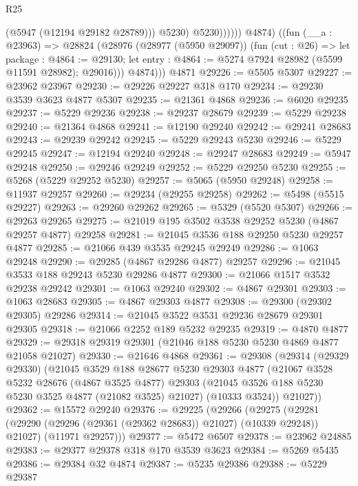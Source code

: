 \begin{lexlean}{R25}
\begin{coremodule}
                        (@5947 (@12194 @29182 @28789)))
                      @5230)
                    @5230))))))
          @4874)
        ((fun (__a : @23963) =>
        @28824
          (@28976
            (@28977 (@5950 @29097))
            (fun (cut : @26) =>
            let package : @4864 := @29130;
            let entry : @4864 := @5274 @7924 @28982 (@5599 @11591 @28982); @29016)))
          @4874)))
    @4871
@29226 := @5505 @5307
@29227 := @23962 @23967
@29230 := @29226 @29227 @318 @170
@29234 := @29230 @3539 @3623 @4877 @5307
@29235 := @21361 @4868
@29236 := @6020 @29235
@29237 := @5229 @29236
@29238 := @29237 @28679
@29239 := @5229 @29238
@29240 := @21364 @4868
@29241 := @12190 @29240
@29242 := @29241 @28683
@29243 := @29239 @29242
@29245 := @5229 @29243 @5230
@29246 := @5229 @29245
@29247 := @12194 @29240
@29248 := @29247 @28683
@29249 := @5947 @29248
@29250 := @29246 @29249
@29252 := @5229 @29250 @5230
@29255 := @5268 (@5229 @29252 @5230)
@29257 := @5065 (@5950 @29248)
@29258 := @11937 @29257
@29260 := @29234 (@29255 @29258)
@29262 := @5498 (@5515 @29227)
@29263 := @29260 @29262
@29265 := @5329 (@5520 @5307)
@29266 := @29263 @29265
@29275 := @21019 @195 @3502 @3538 @29252 @5230 (@4867 @29257 @4877) @29258
@29281 := @21045 @3536 @188 @29250 @5230 @29257 @4877
@29285 := @21066 @439 @3535 @29245 @29249
@29286 := @1063 @29248
@29290 := @29285 (@4867 @29286 @4877) @29257
@29296 := @21045 @3533 @188 @29243 @5230 @29286 @4877
@29300 := @21066 @1517 @3532 @29238 @29242
@29301 := @1063 @29240
@29302 := @4867 @29301
@29303 := @1063 @28683
@29305 := @4867 @29303 @4877
@29308 := @29300 (@29302 @29305) @29286
@29314 := @21045 @3522 @3531 @29236 @28679 @29301 @29305
@29318 := @21066 @2252 @189 @5232 @29235
@29319 := @4870 @4877
@29329 := @29318 @29319 @29301 (@21046 @188 @5230 @5230 @4869 @4877 @21058 @21027)
@29330 := @21646 @4868
@29361 := @29308
    (@29314
      (@29329 @29330)
      (@21045
        @3529
        @188
        @28677
        @5230
        @29303
        @4877
        (@21067
          @3528
          @5232
          @28676
          (@4867 @3525 @4877)
          @29303
          (@21045 @3526 @188 @5230 @5230 @3525 @4877 (@21082 @3525) @21027)
          (@10333 @3524))
        @21027))
@29362 := @15572 @29240
@29376 := @29225
    (@29266
      (@29275
        (@29281 (@29290 (@29296 (@29361 (@29362 @28683)) @21027) (@10339 @29248)) @21027)
        (@11971 @29257)))
@29377 := @5472 @6507
@29378 := @23962 @24885
@29383 := @29377 @29378 @318 @170 @3539 @3623
@29384 := @5269 @5435
@29386 := @29384 @32 @4874
@29387 := @5235 @29386
@29388 := @5229 @29387

\end{coremodule}
\end{lexlean}
